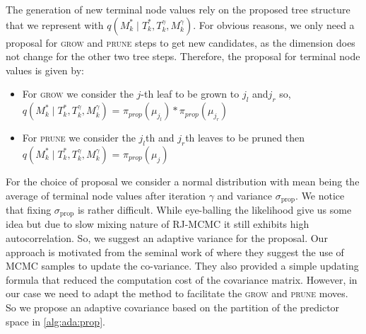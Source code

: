 \documentclass{amsart}
\begin{document}
The generation of new terminal node values rely on the proposed tree structure that we represent with $q\left(M_k^\ast\mid T_k^\ast, T_k^{\gamma}, M_k^{\gamma}\right)$. For obvious reasons, we only need a proposal for \textsc{grow} and \textsc{prune} steps to get new candidates, as the dimension does not change for the other two tree steps. Therefore, the proposal for terminal node values is given by:
\begin{itemize}
	\item For \textsc{grow} we consider the $j$-th leaf to be grown to $j_l$ and$j_r$ so,
	$q\left(M_k^\ast\mid T_k^\ast, T_k^{\gamma}, M_k^{\gamma}\right)$ = $\pi_{prop}(\mu_{j_l})*\pi_{prop}(\mu_{j_r})$
	\item For \textsc{prune} we consider the $j_l$th and $j_r$th leaves to be pruned then $q\left(M_k^\ast\mid T_k^\ast, T_k^{\gamma}, M_k^{\gamma}\right)$ = $\pi_{prop}(\mu_j)$
\end{itemize}
For the choice of proposal we consider a normal distribution with mean being the average of terminal node values after iteration $\gamma$ and variance $\sigma_{\text{prop}}$. We notice that fixing $\sigma_{\text{prop}}$ is rather difficult. While eye-balling the likelihood give us some idea but due to slow mixing nature of RJ-MCMC it still exhibits high autocorrelation. So, we suggest an adaptive variance for the proposal. Our approach is motivated from the seminal work of \citet{haario_AMH} where they suggest the use of MCMC samples to update the co-variance. They also provided a simple updating formula that reduced the computation cost of the covariance matrix. However, in our case we need to adapt the method to facilitate the \textsc{grow} and \textsc{prune} moves. So we propose an adaptive covariance based on the partition of the predictor space in \cref{alg:ada:prop}.
\end{document}
